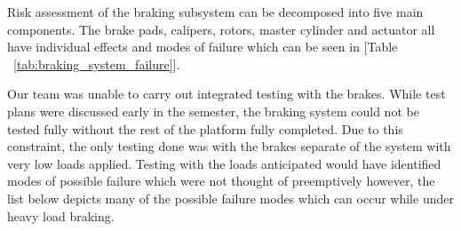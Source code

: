 \indent\indent Risk assessment of the braking subsystem can be decomposed into five main components.  The brake pads, calipers, rotors, master cylinder and actuator all have individual effects and modes of failure which can be seen in [Table ~\ref{tab:braking_system_failure}].

Our team was unable to carry out integrated testing with the brakes. While test plans were discussed early in the semester, the braking system could not be tested fully without the rest of the platform fully completed. Due to this constraint, the only testing done was with the brakes separate of the system with very low loads applied. Testing with the loads anticipated would have identified modes of possible failure which were not thought of preemptively however, the list below depicts many of the possible failure modes which can occur while under heavy load braking. 

